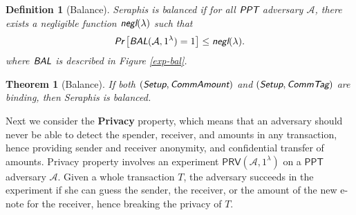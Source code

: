 \documentclass{article}
\newtheorem{definition}{Definition}[section]
\newtheorem{theorem}{Theorem}[section]
\begin{document}
\begin{definition}[Balance]
Seraphis is balanced if for all $\emph{\textsf{PPT}}$ adversary $\mathcal{A}$, there exists a negligible function $\emph{\textsf{negl}}(\lambda)$ such that
\begin{align*}
\emph{\textsf{Pr}}
\left[
\emph{\textsf{BAL}}(\mathcal{A}, 1^{\lambda})=1
\right]
\le \emph{\textsf{negl}}(\lambda).
\end{align*}
where $\emph{\textsf{BAL}}$ is described in Figure \ref{exp-bal}.
\end{definition}
\begin{theorem}[Balance]
If both $(\emph{\textsf{Setup}},\emph{\textsf{CommAmount}})$ and $(\emph{\textsf{Setup}},\emph{\textsf{CommTag}})$ are binding, then Seraphis is balanced.  
\end{theorem}
Next we consider the \textbf{Privacy} property, which means that an adversary should never be able to detect the spender, receiver, and amounts in any transaction, hence providing sender and receiver anonymity, and confidential transfer of amounts. Privacy property involves an experiment $\textsf{PRV}(\mathcal{A}, 1^{\lambda})$ on a $\textsf{PPT}$ adversary $\mathcal{A}$. Given a whole transaction $T$, the adversary succeeds in the experiment if she can guess the sender, the receiver, or the amount of the new e-note for the receiver, hence breaking the privacy of $T$.
\end{document}
